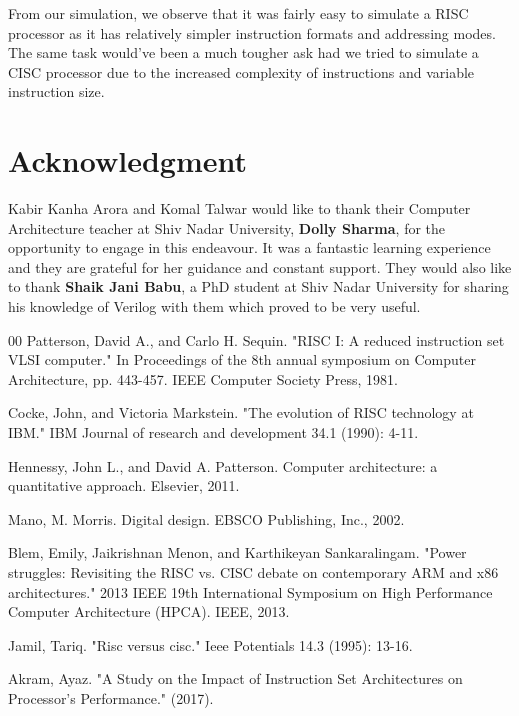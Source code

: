 \documentclass[conference]{IEEEtran}
\begin{document}
From our simulation, we observe that it was fairly easy to simulate a RISC processor as it has relatively simpler instruction formats and addressing modes. The same task would've been a much tougher ask had we tried to simulate a CISC processor due to the increased complexity of instructions and variable instruction size.

\vspace{10mm}
\section*{Acknowledgment}

Kabir Kanha Arora and Komal Talwar would like to thank their Computer Architecture teacher at Shiv Nadar University, \textbf{Dolly Sharma}, for the opportunity to engage in this endeavour. It was a fantastic learning experience and they are grateful for her guidance and constant support. They would also like to thank \textbf{Shaik Jani Babu}, a PhD student at Shiv Nadar University for sharing his knowledge of Verilog with them which proved to be very useful.

\begin{thebibliography}{00}
 Patterson, David A., and Carlo H. Sequin. "RISC I: A reduced instruction set VLSI computer." In Proceedings of the 8th annual symposium on Computer Architecture, pp. 443-457. IEEE Computer Society Press, 1981.

 Cocke, John, and Victoria Markstein. "The evolution of RISC technology at IBM." IBM Journal of research and development 34.1 (1990): 4-11.

 Hennessy, John L., and David A. Patterson. Computer architecture: a quantitative approach. Elsevier, 2011.

 Mano, M. Morris. Digital design. EBSCO Publishing, Inc., 2002.

 Blem, Emily, Jaikrishnan Menon, and Karthikeyan Sankaralingam. "Power struggles: Revisiting the RISC vs. CISC debate on contemporary ARM and x86 architectures." 2013 IEEE 19th International Symposium on High Performance Computer Architecture (HPCA). IEEE, 2013.

 Jamil, Tariq. "Risc versus cisc." Ieee Potentials 14.3 (1995): 13-16.

 Akram, Ayaz. "A Study on the Impact of Instruction Set Architectures on Processor’s Performance." (2017).

\end{thebibliography}
\end{document}
